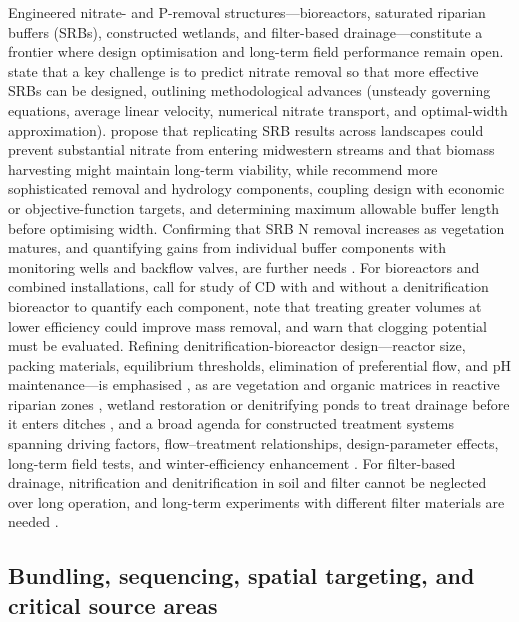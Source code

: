 \documentclass[11pt]{article}
\begin{document}
Engineered nitrate- and P-removal structures---bioreactors, saturated riparian buffers (SRBs), constructed wetlands, and filter-based drainage---constitute a frontier where design optimisation and long-term field performance remain open. \textcite{McEachran2020} state that a key challenge is to predict nitrate removal so that more effective SRBs can be designed, outlining methodological advances (unsteady governing equations, average linear velocity, numerical nitrate transport, and optimal-width approximation). \textcite{Jaynes2014} propose that replicating SRB results across landscapes could prevent substantial nitrate from entering midwestern streams and that biomass harvesting might maintain long-term viability, while \textcite{Abdalaal2023} recommend more sophisticated removal and hydrology components, coupling design with economic or objective-function targets, and determining maximum allowable buffer length before optimising width. Confirming that SRB N removal increases as vegetation matures, and quantifying gains from individual buffer components with monitoring wells and backflow valves, are further needs \parencite{Jaynes2019,Singh2024b}. For bioreactors and combined installations, \textcite{Husk2017} call for study of CD with and without a denitrification bioreactor to quantify each component, note that treating greater volumes at lower efficiency could improve mass removal, and warn that clogging potential must be evaluated. Refining denitrification-bioreactor design---reactor size, packing materials, equilibrium thresholds, elimination of preferential flow, and pH maintenance---is emphasised \parencite{Aide2016}, as are vegetation and organic matrices in reactive riparian zones \parencite{Vallée2014}, wetland restoration or denitrifying ponds to treat drainage before it enters ditches \parencite{Randall2001}, and a broad agenda for constructed treatment systems spanning driving factors, flow--treatment relationships, design-parameter effects, long-term field tests, and winter-efficiency enhancement \parencite{Mendes2021}. For filter-based drainage, nitrification and denitrification in soil and filter cannot be neglected over long operation, and long-term experiments with different filter materials are needed \parencite{Tao2022}.

\subsection{Bundling, sequencing, spatial targeting, and critical source areas}
\end{document}

